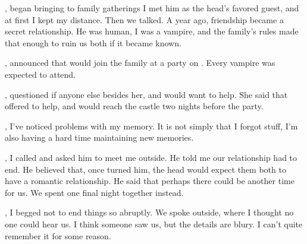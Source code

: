 {,  began bringing  to family gatherings I met him as the head's favored guest, and at first I kept my distance. Then we talked. A year ago, friendship became a secret relationship. He was human, I was a vampire, and the family's rules made that enough to ruin us both if it became known.

,  announced that  would join the family at a party on . Every vampire was expected to attend.

,  questioned if anyone else besides her,  and  would want to help. She said that  offered to help, and would reach the castle two nights before the party.

, I've noticed problems with my memory. It is not simply that I forgot stuff, I'm also having a hard time maintaining new memories.

, I called  and asked him to meet me outside. He told me our relationship had to end. He believed that, once  turned him, the head would expect them both to have a romantic relationship. He said that perhaps there could be another time for us. We spent one final night together instead.

, I begged  not to end things so abruptly. We spoke outside, where I thought no one could hear us. I think someone saw us, but the details are blury. I can't quite remember it for some reason.

}
